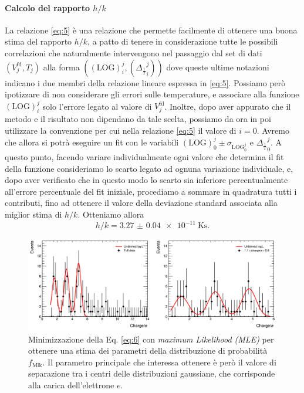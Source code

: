 \documentclass[a4paper, varvw, nofootinbib]{revtex4-2}
\begin{document}
\paragraph*{Calcolo del rapporto $h/k$} La relazione \eqref{eq:5} è una relazione che permette facilmente di ottenere una buona stima del rapporto $h/k$, a patto di tenere in considerazione tutte le possibili correlazioni che naturalmente intervengono nel passaggio dal set di dati $(V_j^\text{fd}, T_j)$ alla forma $((\text{LOG})_i^j, ({\Delta_{\frac{1}{T}}}_i^j))$ dove queste ultime notazioni indicano i due membri della relazione lineare espressa in \eqref{eq:5}. Possiamo però ipotizzare di non considerare gli errori sulle temperature, e associare alla funzione $(\text{LOG})_i^j$ solo l'errore legato al valore di $V_j^\text{fd}$. 
Inoltre, dopo aver appurato che il metodo e il risultato non dipendano da tale scelta, possiamo da ora in poi utilizzare la convenzione per cui nella relazione \eqref{eq:5} il valore di $i=0$. Avremo che allora si potrà eseguire un fit con le variabili $(\text{LOG})_0^j\pm\sigma_\text{LOG$_0^j$}$ e ${\Delta_{\frac{1}{T}}}_0^j$. A questo punto, facendo variare individualmente ogni valore che determina il fit della funzione consideriamo lo scarto legato ad ognuna variazione individuale, e, dopo aver verificato che in questo modo lo scarto sia inferiore percentualmente all'errore percentuale del fit iniziale, procediamo a sommare in quadratura tutti i contributi, fino ad ottenere il valore della deviazione standard associata alla miglior stima di $h/k$. Otteniamo allora \[h/k = \SI{3.27(4)e-11}{\kelvin\second}.\]

\begin{figure}
\centering
\includegraphics[width=14cm]{fig/millikan}
\caption{Minimizzazione della Eq. \eqref{eq:6} con \emph{maximum Likelihood (MLE)} per ottenere una stima dei parametri della distribuzione di probabilità $f_\text{Mlk}$. Il parametro principale che interessa ottenere è però il valore di separazione tra i centri delle distribuzioni gaussiane, che corrisponde alla carica dell'elettrone $e$.}
\end{figure}
\end{document}
